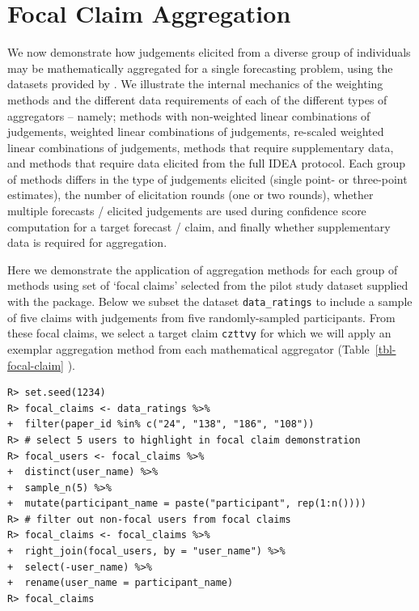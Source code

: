 \documentclass[article]{jss}
\begin{document}
\hypertarget{focal-claim-aggregation}{%
\section{Focal Claim Aggregation}\label{focal-claim-aggregation}}

We now demonstrate how judgements elicited from a diverse group of
individuals may be mathematically aggregated for a single forecasting
problem, using the datasets provided by . We illustrate
the internal mechanics of the weighting methods and the different data
requirements of each of the different types of aggregators -- namely;
methods with non-weighted linear combinations of judgements, weighted
linear combinations of judgements, re-scaled weighted linear
combinations of judgements, methods that require supplementary data, and
methods that require data elicited from the full IDEA protocol. Each
group of methods differs in the type of judgements elicited (single
point- or three-point estimates), the number of elicitation rounds (one
or two rounds), whether multiple forecasts / elicited judgements are
used during confidence score computation for a target forecast / claim,
and finally whether supplementary data is required for aggregation.

Here we demonstrate the application of aggregation methods for each
group of methods using set of `focal claims' selected from the pilot
study dataset supplied with the  package. Below we subset
the dataset \texttt{data\_ratings} to include a sample of five claims
with judgements from five randomly-sampled participants. From these
focal claims, we select a target claim \texttt{czttvy} for which we will
apply an exemplar aggregation method from each mathematical aggregator
(Table~\ref{tbl-focal-claim} ).

\begin{verbatim}
R> set.seed(1234)
R> focal_claims <- data_ratings %>% 
+  filter(paper_id %in% c("24", "138", "186", "108"))
R> # select 5 users to highlight in focal claim demonstration
R> focal_users <- focal_claims %>% 
+  distinct(user_name) %>% 
+  sample_n(5) %>% 
+  mutate(participant_name = paste("participant", rep(1:n())))
R> # filter out non-focal users from focal claims
R> focal_claims <- focal_claims %>%  
+  right_join(focal_users, by = "user_name") %>% 
+  select(-user_name) %>% 
+  rename(user_name = participant_name)
R> focal_claims
\end{verbatim}
\end{document}
